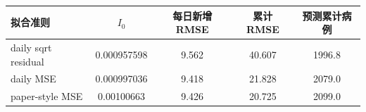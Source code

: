 \begin{tabular}{lcccc}
\toprule
拟合准则 & $I_0$ & 每日新增RMSE & 累计RMSE & 预测累计病例 \\
\midrule
daily sqrt residual & 0.000957598 & 9.562 & 40.607 & 1996.8 \\
daily MSE & 0.000997036 & 9.418 & 21.828 & 2079.0 \\
paper-style MSE & 0.00100663 & 9.426 & 20.725 & 2099.0 \\
\bottomrule
\end{tabular}
